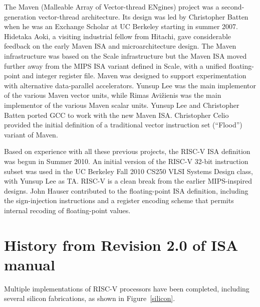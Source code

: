 The Maven (Malleable Array of Vector-thread ENgines) project was a
second-generation vector-thread architecture.  Its design was led by
Christopher Batten when he was an Exchange Scholar at UC Berkeley starting
in summer 2007.  Hidetaka Aoki, a visiting industrial fellow from
Hitachi, gave considerable feedback on the early Maven ISA and
microarchitecture design.  The Maven infrastructure was based on the
Scale infrastructure but the Maven ISA moved further away from the
MIPS ISA variant defined in Scale, with a unified floating-point and
integer register file.  Maven was designed to support experimentation
with alternative data-parallel accelerators.  Yunsup Lee was the main
implementor of the various Maven vector units, while Rimas Avi\v{z}ienis
was the main implementor of the various Maven scalar units.
Yunsup Lee and Christopher Batten ported GCC to work with the new
Maven ISA.  Christopher Celio provided the initial definition of a
traditional vector instruction set (``Flood'') variant of Maven.

Based on experience with all these previous projects, the RISC-V ISA
definition was begun in Summer 2010.  An initial version of the RISC-V
32-bit instruction subset was used in the UC Berkeley Fall 2010 CS250
VLSI Systems Design class, with Yunsup Lee as TA.  RISC-V is a clean
break from the earlier MIPS-inspired designs.  John Hauser contributed
to the floating-point ISA definition, including the sign-injection
instructions and a register encoding scheme that permits
internal recoding of floating-point values.

\section{History from Revision 2.0 of ISA manual}

Multiple implementations of RISC-V processors have been completed,
including several silicon fabrications, as shown in
Figure~\ref{silicon}.

